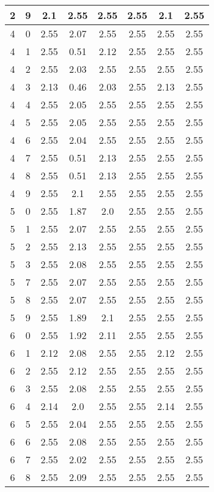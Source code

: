 \begin{longtable}{|c|c||c||c|c|c||c|c|}
	2 & 9 & 2.1 & 2.55 & 2.55 & 2.55 & 2.1 & 2.55 \\ \hline
	4 & 0 & 2.55 & 2.07 & 2.55 & 2.55 & 2.55 & 2.55 \\ \hline
	4 & 1 & 2.55 & 0.51 & 2.12 & 2.55 & 2.55 & 2.55 \\ \hline
	4 & 2 & 2.55 & 2.03 & 2.55 & 2.55 & 2.55 & 2.55 \\ \hline
	4 & 3 & 2.13 & 0.46 & 2.03 & 2.55 & 2.13 & 2.55 \\ \hline
	4 & 4 & 2.55 & 2.05 & 2.55 & 2.55 & 2.55 & 2.55 \\ \hline
	4 & 5 & 2.55 & 2.05 & 2.55 & 2.55 & 2.55 & 2.55 \\ \hline
	4 & 6 & 2.55 & 2.04 & 2.55 & 2.55 & 2.55 & 2.55 \\ \hline
	4 & 7 & 2.55 & 0.51 & 2.13 & 2.55 & 2.55 & 2.55 \\ \hline
	4 & 8 & 2.55 & 0.51 & 2.13 & 2.55 & 2.55 & 2.55 \\ \hline
	4 & 9 & 2.55 & 2.1 & 2.55 & 2.55 & 2.55 & 2.55 \\ \hline
	5 & 0 & 2.55 & 1.87 & 2.0 & 2.55 & 2.55 & 2.55 \\ \hline
	5 & 1 & 2.55 & 2.07 & 2.55 & 2.55 & 2.55 & 2.55 \\ \hline
	5 & 2 & 2.55 & 2.13 & 2.55 & 2.55 & 2.55 & 2.55 \\ \hline
	5 & 3 & 2.55 & 2.08 & 2.55 & 2.55 & 2.55 & 2.55 \\ \hline
	5 & 7 & 2.55 & 2.07 & 2.55 & 2.55 & 2.55 & 2.55 \\ \hline
	5 & 8 & 2.55 & 2.07 & 2.55 & 2.55 & 2.55 & 2.55 \\ \hline
	5 & 9 & 2.55 & 1.89 & 2.1 & 2.55 & 2.55 & 2.55 \\ \hline
	6 & 0 & 2.55 & 1.92 & 2.11 & 2.55 & 2.55 & 2.55 \\ \hline
	6 & 1 & 2.12 & 2.08 & 2.55 & 2.55 & 2.12 & 2.55 \\ \hline
	6 & 2 & 2.55 & 2.12 & 2.55 & 2.55 & 2.55 & 2.55 \\ \hline
	6 & 3 & 2.55 & 2.08 & 2.55 & 2.55 & 2.55 & 2.55 \\ \hline
	6 & 4 & 2.14 & 2.0 & 2.55 & 2.55 & 2.14 & 2.55 \\ \hline
	6 & 5 & 2.55 & 2.04 & 2.55 & 2.55 & 2.55 & 2.55 \\ \hline
	6 & 6 & 2.55 & 2.08 & 2.55 & 2.55 & 2.55 & 2.55 \\ \hline
	6 & 7 & 2.55 & 2.02 & 2.55 & 2.55 & 2.55 & 2.55 \\ \hline
	6 & 8 & 2.55 & 2.09 & 2.55 & 2.55 & 2.55 & 2.55 \\ \hline

\end{longtable}
